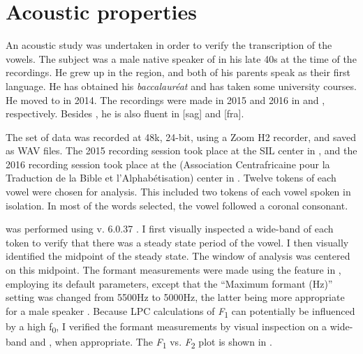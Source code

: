 \documentclass[output=paper,colorlinks,citecolor=brown]{langscibook}
\begin{document}
\section{Acoustic properties}\label{sec:olson:3}

An acoustic study  was undertaken in order to verify the transcription of the  vowels. The subject was a male native speaker of  in his late 40s at the time of the recordings. He grew up in the  region, and both of his parents speak  as their first language. He has obtained his \textit{baccalauréat} and has taken some university courses. He moved to  in 2014. The recordings were made in 2015 and 2016 in  and , respectively. Besides , he is also fluent in  [sag] and  [fra].

The set of data was recorded at 48k, 24-bit, using a Zoom H2 recorder, and saved as WAV files. The 2015 recording session took place at the SIL center in , and the 2016 recording session took place at the  (Association Centrafricaine pour la Traduction de la Bible et l’Alphabétisation) center in . Twelve tokens of each vowel were chosen for analysis. This included two tokens of each vowel spoken in isolation. In most of the words selected, the vowel followed a coronal consonant.

 was performed using  v. 6.0.37 \citep{BoersmaWeenink2018}. I first visually inspected a wide-band  of each token to verify that there was a steady state period of the vowel. I then visually identified the midpoint of the steady state. The window of analysis was centered on this midpoint. The formant measurements were made using the  feature in , employing its default parameters, except that the “Maximum formant (Hz)” setting was changed from 5500Hz to 5000Hz, the latter being more appropriate for a male speaker \citep{BoersmaWeenink2018}. Because LPC calculations of \textit{F}\textsubscript{1} can potentially be influenced by a high ƒ\textsubscript{0}, I verified the formant measurements by visual inspection on a wide-band  and , when appropriate. The \textit{F}\textsubscript{1} vs. \textit{F}\textsubscript{2} plot is shown in .
\end{document}
